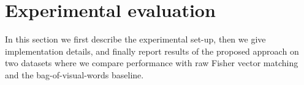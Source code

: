 \documentclass[table]{article} %
\begin{document}








\section{Experimental evaluation}
\label{sec:exp}

	In this section we first describe the experimental set-up, then we give implementation details, and finally report results of the proposed approach on two datasets where we compare performance with raw Fisher vector matching and the bag-of-visual-words baseline. %
\end{document}

